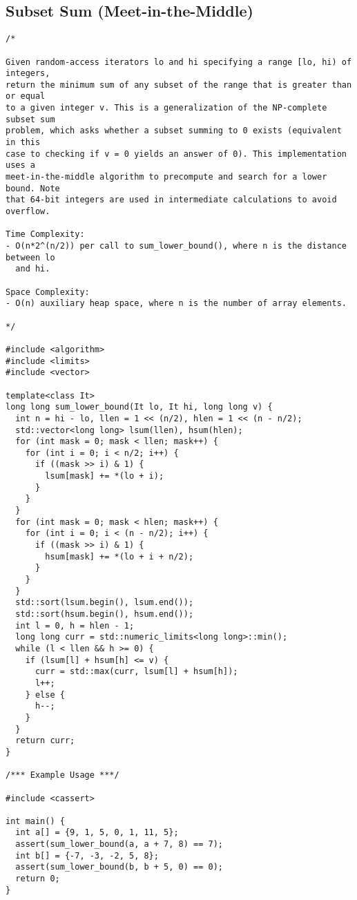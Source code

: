 \subsection{Subset Sum (Meet-in-the-Middle)}
\begin{lstlisting}
/*

Given random-access iterators lo and hi specifying a range [lo, hi) of integers,
return the minimum sum of any subset of the range that is greater than or equal
to a given integer v. This is a generalization of the NP-complete subset sum
problem, which asks whether a subset summing to 0 exists (equivalent in this
case to checking if v = 0 yields an answer of 0). This implementation uses a
meet-in-the-middle algorithm to precompute and search for a lower bound. Note
that 64-bit integers are used in intermediate calculations to avoid overflow.

Time Complexity:
- O(n*2^(n/2)) per call to sum_lower_bound(), where n is the distance between lo
  and hi.

Space Complexity:
- O(n) auxiliary heap space, where n is the number of array elements.

*/

#include <algorithm>
#include <limits>
#include <vector>

template<class It>
long long sum_lower_bound(It lo, It hi, long long v) {
  int n = hi - lo, llen = 1 << (n/2), hlen = 1 << (n - n/2);
  std::vector<long long> lsum(llen), hsum(hlen);
  for (int mask = 0; mask < llen; mask++) {
    for (int i = 0; i < n/2; i++) {
      if ((mask >> i) & 1) {
        lsum[mask] += *(lo + i);
      }
    }
  }
  for (int mask = 0; mask < hlen; mask++) {
    for (int i = 0; i < (n - n/2); i++) {
      if ((mask >> i) & 1) {
        hsum[mask] += *(lo + i + n/2);
      }
    }
  }
  std::sort(lsum.begin(), lsum.end());
  std::sort(hsum.begin(), hsum.end());
  int l = 0, h = hlen - 1;
  long long curr = std::numeric_limits<long long>::min();
  while (l < llen && h >= 0) {
    if (lsum[l] + hsum[h] <= v) {
      curr = std::max(curr, lsum[l] + hsum[h]);
      l++;
    } else {
      h--;
    }
  }
  return curr;
}

/*** Example Usage ***/

#include <cassert>

int main() {
  int a[] = {9, 1, 5, 0, 1, 11, 5};
  assert(sum_lower_bound(a, a + 7, 8) == 7);
  int b[] = {-7, -3, -2, 5, 8};
  assert(sum_lower_bound(b, b + 5, 0) == 0);
  return 0;
}
\end{lstlisting}
